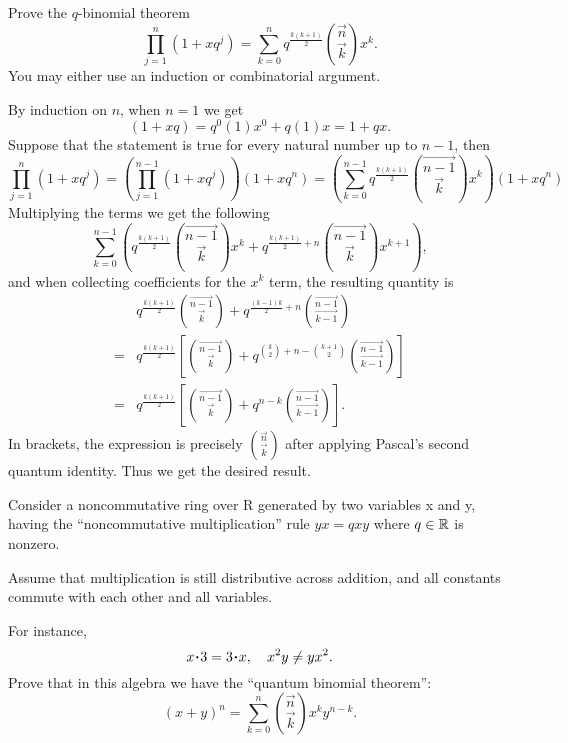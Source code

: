 \documentclass[12pt]{memoir}
\begin{document}
\begin{Ej}[Exercise 2]
   Prove the $q$-binomial theorem 
   $$\prod_{j=1}^n(1+xq^j)=\sum_{k=0}^nq^{\frac{k(k+1)}{2}}\binom{\vec{n}}{\vec{k}}x^k.$$
   You may either use an induction or combinatorial argument.
\end{Ej}
\begin{ptcbr}
    By induction on $n$, when $n=1$ we get 
    $$(1+xq)=q^0(1)x^0+q(1)x=1+qx.$$
    Suppose that the statement is true for every natural number up to $n-1$, then 
    $$\prod_{j=1}^n(1+xq^j)=\left(\prod_{j=1}^{n-1}(1+xq^j)\right)(1+xq^n)=\left(\sum_{k=0}^{n-1}q^{\frac{k(k+1)}{2}}\binom{\vec{n-1}}{\vec{k}}x^k\right)(1+xq^n)$$
    Multiplying the terms we get the following
    $$\sum_{k=0}^{n-1}\left(q^{\frac{k(k+1)}{2}}\binom{\vec{n-1}}{\vec{k}}x^k+q^{\frac{k(k+1)}{2}+n}\binom{\vec{n-1}}{\vec{k}}x^{k+1}\right),$$
    and when collecting coefficients for the $x^k$ term, the resulting quantity is 
    \begin{align*}
        &q^{\frac{k(k+1)}{2}}\binom{\vec{n-1}}{\vec{k}}+q^{\frac{(k-1)k}{2}+n}\binom{\vec{n-1}}{\vec{k-1}}\\
        =&q^{\frac{k(k+1)}{2}}\left\lbrack\binom{\vec{n-1}}{\vec{k}}+q^{\binom{k}{2}+n-\binom{k+1}{2}}\binom{\vec{n-1}}{\vec{k-1}}\right\rbrack\\
        =&q^{\frac{k(k+1)}{2}}\left\lbrack\binom{\vec{n-1}}{\vec{k}}+q^{n-k}\binom{\vec{n-1}}{\vec{k-1}}\right\rbrack.
    \end{align*}
    In brackets, the expression is precisely $\binom{\vec n}{\vec k}$ after applying Pascal's second quantum identity. Thus we get the desired result.
    \iffalse
    Consider the function $p(x)=\prod_{j=1}^n(1+xq^j)$, and let us evaluate at $x=qx$:
    \begin{align*}
        p(qx)&=(1+(qx)q)(1+(qx)q^2)\dots(1+(qx)q^n)\\
        &=(1+xq^2)(1+xq^3)\dots(1+xq^{n+1})\\
        \To(1+xq)p(qx)&=\left\lbrack(1+xq)\dots(1+xq^{n})\right\rbrack(1+xq^{n+1})\\
        \To(1+xq)p(qx)&=p(x)(1+xq^{n+1}).
    \end{align*}
    Now, if we expand $p$ as a sum of monomials and call $a_k=a_k(q)$ the coefficient of $x^k$, we can compare coefficients on both sides:
    \fi
\end{ptcbr}

\begin{Ej}[Exercise 3]
Consider a noncommutative ring over R generated by two variables x
and y, having the ``noncommutative multiplication'' rule $yx=qxy$ where $q\in\mathbb{R}$ is nonzero.\par 
Assume that multiplication is still distributive across addition, and all constants commute with each other and all variables.\par 
For instance,
$$x\.3=3\.x,\quad x^2y\neq yx^2.$$
Prove that in this algebra we have the ``quantum binomial theorem'':
$$(x+y)^n=\sum_{k=0}^n\binom{\vec n}{\vec k}x^ky^{n-k}.$$
\end{Ej}
\end{document}

